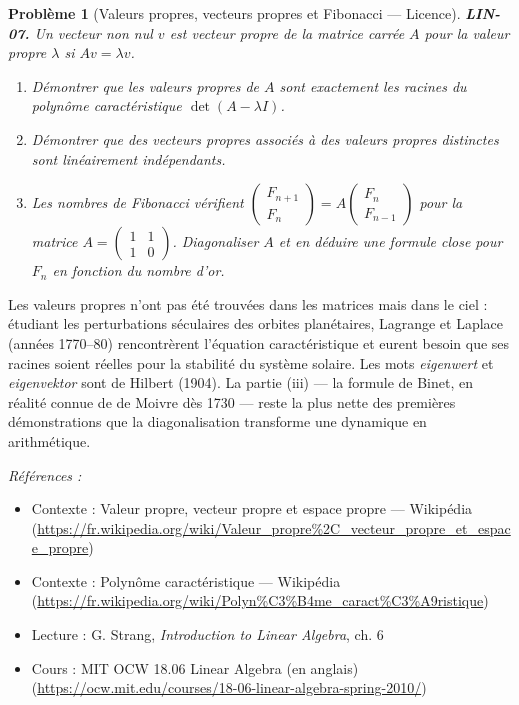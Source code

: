 \documentclass[11pt]{article}
\newtheorem{problem}{Problème}
\newenvironment{refs}{\par\small\noindent\emph{Références :}\begin{itemize}\setlength\itemsep{0pt}}{\end{itemize}\normalsize}
\begin{document}
\begin{problem}[{Valeurs propres, vecteurs propres et Fibonacci --- Licence}]
\textbf{LIN-07.} Un vecteur non nul $v$ est \textit{vecteur propre} de la
matrice carrée $A$ pour la \textit{valeur propre} $\lambda$ si $Av = \lambda v$.
\begin{enumerate}
\item[(i)] Démontrer que
les valeurs propres de $A$ sont exactement les racines du polynôme caractéristique
$\det(A - \lambda I)$.
\item[(ii)] Démontrer que des vecteurs propres associés à des valeurs propres distinctes sont
linéairement indépendants.
\item[(iii)] Les nombres de Fibonacci vérifient
$\begin{pmatrix} F_{n+1} \\ F_n \end{pmatrix} = A \begin{pmatrix} F_n \\ F_{n-1} \end{pmatrix}$
pour la matrice $A = \begin{pmatrix} 1 & 1 \\ 1 & 0 \end{pmatrix}$. Diagonaliser $A$
et en déduire une formule close pour $F_n$ en fonction du nombre d'or.
\end{enumerate}

\end{problem}

\noindent Les valeurs propres n'ont pas été trouvées dans les matrices mais dans le ciel :
étudiant les perturbations séculaires des orbites planétaires, Lagrange et Laplace (années 1770--80)
rencontrèrent l'équation caractéristique et eurent besoin que ses racines soient réelles pour la
stabilité du système solaire. Les mots \textit{eigenwert} et \textit{eigenvektor} sont de Hilbert (1904).
La partie (iii) --- la formule de Binet, en réalité connue de de Moivre dès 1730 --- reste la plus nette
des premières démonstrations que la diagonalisation transforme une dynamique en arithmétique.

\begin{refs}
\item Contexte : Valeur propre, vecteur propre et espace propre --- Wikipédia (\url{https://fr.wikipedia.org/wiki/Valeur_propre%2C_vecteur_propre_et_espace_propre})
\item Contexte : Polynôme caractéristique --- Wikipédia (\url{https://fr.wikipedia.org/wiki/Polyn%C3%B4me_caract%C3%A9ristique})
\item Lecture : G. Strang, \textit{Introduction to Linear Algebra}, ch. 6
\item Cours : MIT OCW 18.06 Linear Algebra (en anglais) (\url{https://ocw.mit.edu/courses/18-06-linear-algebra-spring-2010/})
\end{refs}
\end{document}
